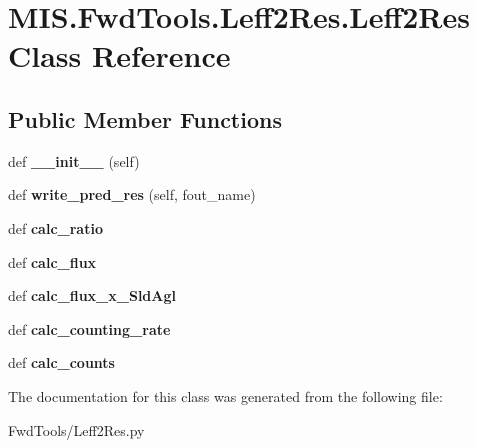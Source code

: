 \hypertarget{classMIS_1_1FwdTools_1_1Leff2Res_1_1Leff2Res}{}\section{M\+I\+S.\+Fwd\+Tools.\+Leff2\+Res.\+Leff2\+Res Class Reference}
\label{classMIS_1_1FwdTools_1_1Leff2Res_1_1Leff2Res}
\subsection*{Public Member Functions}
\begin{DoxyCompactItemize}
\item 
\mbox{\label{classMIS_1_1FwdTools_1_1Leff2Res_1_1Leff2Res_a690bc3157eb2a9bdac517a19a1b36118}} 
def {\bfseries \+\_\+\+\_\+init\+\_\+\+\_\+} (self)
\item 
\mbox{\label{classMIS_1_1FwdTools_1_1Leff2Res_1_1Leff2Res_a5995b633ae8b907ea303f8fde26ae1a0}} 
def {\bfseries write\+\_\+pred\+\_\+res} (self, fout\+\_\+name)
\item 
\mbox{\label{classMIS_1_1FwdTools_1_1Leff2Res_1_1Leff2Res_aa0f71375f8451f493ff78148358a20ef}} 
def {\bfseries calc\+\_\+ratio}
\item 
\mbox{\label{classMIS_1_1FwdTools_1_1Leff2Res_1_1Leff2Res_a4588b6240a5e2a5c65031b382d51ba64}} 
def {\bfseries calc\+\_\+flux}
\item 
\mbox{\label{classMIS_1_1FwdTools_1_1Leff2Res_1_1Leff2Res_a7d200d70435c54c52770adf2fba8aa4c}} 
def {\bfseries calc\+\_\+flux\+\_\+x\+\_\+\+Sld\+Agl}
\item 
\mbox{\label{classMIS_1_1FwdTools_1_1Leff2Res_1_1Leff2Res_a8eaac72e31b2de692ae7a1c2c1403451}} 
def {\bfseries calc\+\_\+counting\+\_\+rate}
\item 
\mbox{\label{classMIS_1_1FwdTools_1_1Leff2Res_1_1Leff2Res_ad5e1b641721179d4af30fd8666f0333c}} 
def {\bfseries calc\+\_\+counts}
\end{DoxyCompactItemize}


The documentation for this class was generated from the following file\+:\begin{DoxyCompactItemize}
\item 
Fwd\+Tools/Leff2\+Res.\+py\end{DoxyCompactItemize}
